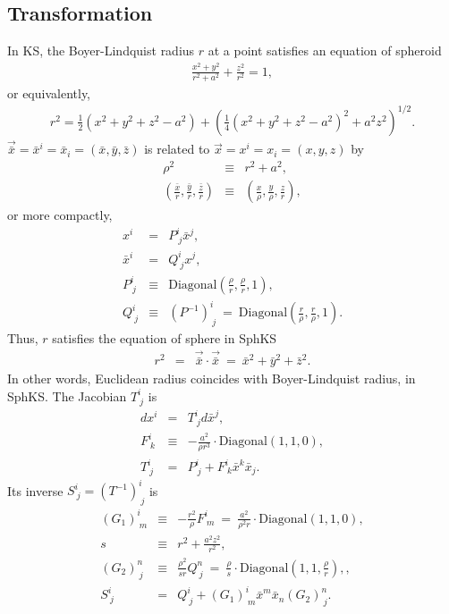 \documentclass{article}
\begin{document}
\subsection{Transformation}
In KS, the Boyer-Lindquist radius $r$ at a point satisfies an equation of spheroid
\begin{eqnarray}
	\frac{x^2+y^2}{r^2+a^2}+\frac{z^2}{r^2} = 1,
\end{eqnarray}
or equivalently,
\begin{eqnarray}
	r^2 = \frac{1}{2}(x^2 + y^2 + z^2 - a^2) 
	+ \left(\frac{1}{4}(x^2 + y^2 + z^2 - a^2)^2 + a^2 z^2\right)^{1/2}.
\end{eqnarray}
$\vec{\bar{x}} = \bar{x}^i = \bar{x}_i = (\bar{x},\bar{y},\bar{z})$ is related to $\vec{x} = x^i = x_i = (x,y,z)$ by
\begin{eqnarray}
	\rho^2 &\equiv& r^2+a^2, \\
	\left(\frac{\bar{x}}{r},\frac{\bar{y}}{r},\frac{\bar{z}}{r}\right) &\equiv& 
	\left(\frac{x}{\rho},\frac{y}{\rho},\frac{z}{r}\right),
\end{eqnarray}
or more compactly,
\begin{eqnarray}
	x^i &=& P^i_{\ j} \bar{x}^j, \\
	\bar{x}^i &=& Q^i_{\ j} x^j, \\
	P^i_{\ j} &\equiv& \mbox{Diagonal} \left(\frac{\rho}{r},\frac{\rho}{r},1\right), \\
	Q^i_{\ j} &\equiv& (P^{-1})^i_{\ j} \ =\  \mbox{Diagonal}\left(\frac{r}{\rho},\frac{r}{\rho},1\right).
\end{eqnarray}
Thus, $r$ satisfies the equation of sphere in SphKS
\begin{eqnarray}
	r^2 &=& \vec{\bar{x}}\cdot \vec{\bar{x}} \ =\  \bar{x}^2+\bar{y}^2+\bar{z}^2.
\end{eqnarray}
In other words, Euclidean radius coincides with Boyer-Lindquist radius, in SphKS. The Jacobian $T^i_{\ j}$ is
\begin{eqnarray}
	dx^i &=& T^i_{\ j} d\bar{x}^j, \\
	F^i_{\ k} &\equiv& -\frac{a^2}{\rho r^3}\cdot\mbox{Diagonal} (1,1,0), \\
	T^i_{\ j} &=& P^i_{\ j} +F^i_{\ k}\bar{x}^k\bar{x}_j. 
\end{eqnarray}
Its inverse $S^i_{\ j} = (T^{-1})^i_{\ j}$ is
\begin{eqnarray}
	(G_1)^i_{\ m} &\equiv& -\frac{r^2}{\rho}F^i_{\ m} \ =\  \frac{a^2}{\rho^2 r} \cdot\mbox{Diagonal} (1,1,0), \\
	s &\equiv& r^2+\frac{a^2z^2}{r^2}, \\
	(G_2)^n_{\ j} &\equiv& \frac{\rho^2}{sr}Q^n_{\ j} \ =\  \frac{\rho}{s}\cdot\mbox{Diagonal}\left(1,1,\frac{\rho}{r}\right),, \\
	S^i_{\ j} &=& Q^i_{\ j} +(G_1)^i_{\ m}\bar{x}^m\bar{x}_n(G_2)^n_{\ j}.
\end{eqnarray}
\end{document}
